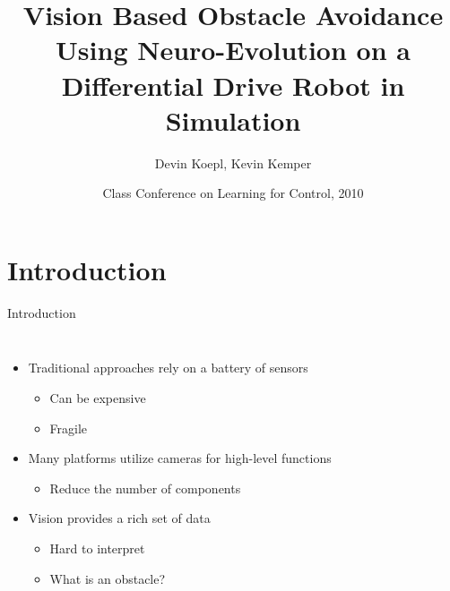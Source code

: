 \documentclass{beamer}
\title{Vision Based Obstacle Avoidance Using Neuro-Evolution on a Differential Drive Robot in Simulation}
\author{Devin Koepl, Kevin Kemper}
\institute[Oregon State University] %
{
	Dynamic Robotics Laboratory\\
	Oregon State University
}
\date[ME 537 2010] %
	{Class Conference on Learning for Control, 2010}
\begin{document}
\frame{\titlepage}


\section{Introduction}

	\begin{frame}{Introduction}
	\begin{columns}[l c]


			\begin{itemize}
			\item Traditional approaches rely on a battery of sensors
				\begin{itemize}
				\item Can be expensive
				\item Fragile 
				\end{itemize}

			\item Many platforms utilize cameras for high-level functions
				\begin{itemize}
				\item Reduce the number of components
				\end{itemize}

			\item Vision provides a rich set of data
				\begin{itemize}
				\item Hard to interpret
				\item What is an obstacle?
				\end{itemize}

			\end{itemize}




\end{columns}
\end{frame}
\end{document}
